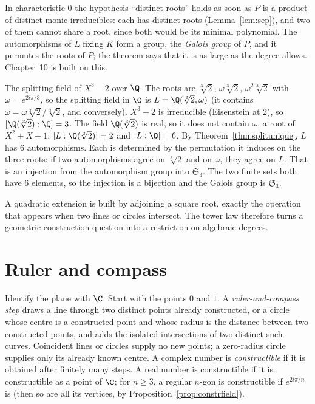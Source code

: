 In characteristic $0$ the hypothesis ``distinct roots'' holds as soon as $P$ is a product of distinct monic irreducibles: each has distinct roots (Lemma~\ref{lem:sep}), and two of them cannot share a root, since both would be its minimal polynomial. The automorphisms of $L$ fixing $K$ form a group, the \emph{Galois group} of $P$, and it permutes the roots of $P$; the theorem says that it is as large as the degree allows. Chapter~10 is built on this.

\begin{example}\label{ex:cuberoot}
The splitting field of $X^3-2$ over $\Q$. The roots are $\sqrt[3]2$, $\omega\sqrt[3]2$, $\omega^2\sqrt[3]2$ with $\omega=e^{2i\pi/3}$, so the splitting field in $\C$ is $L=\Q(\sqrt[3]2,\omega)$ (it contains $\omega=\omega\sqrt[3]2/\sqrt[3]2$, and conversely). $X^3-2$ is irreducible (Eisenstein at $2$), so $[\Q(\sqrt[3]2):\Q]=3$. The field $\Q(\sqrt[3]2)$ is real, so it does not contain $\omega$, a root of $X^2+X+1$: $[L:\Q(\sqrt[3]2)]=2$ and $[L:\Q]=6$. By Theorem~\ref{thm:splitunique}, $L$ has $6$ automorphisms. Each is determined by the permutation it induces on the three roots: if two automorphisms agree on $\sqrt[3]{2}$ and on $\omega$, they agree on $L$. That is an injection from the automorphism group into $\mathfrak S_3$. The two finite sets both have $6$ elements, so the injection is a bijection and the Galois group is $\mathfrak S_3$.
\end{example}

A quadratic extension is built by adjoining a square root, exactly the operation that appears when two lines or circles intersect. The tower law therefore turns a geometric construction question into a restriction on algebraic degrees.

\section{Ruler and compass}

Identify the plane with $\C$. Start with the points $0$ and $1$. A \emph{ruler-and-compass step} draws a line through two distinct points already constructed, or a circle whose centre is a constructed point and whose radius is the distance between two constructed points, and adds the isolated intersections of two distinct such curves. Coincident
lines or circles supply no new points; a zero-radius circle supplies only its
already known centre. A complex number is \emph{constructible} if it is obtained after finitely many steps. A real number is constructible if it is constructible as a point of $\C$; for $n\ge3$, a regular $n$-gon is constructible if $e^{2i\pi/n}$ is (then so are all its vertices, by Proposition~\ref{prop:constrfield}).


